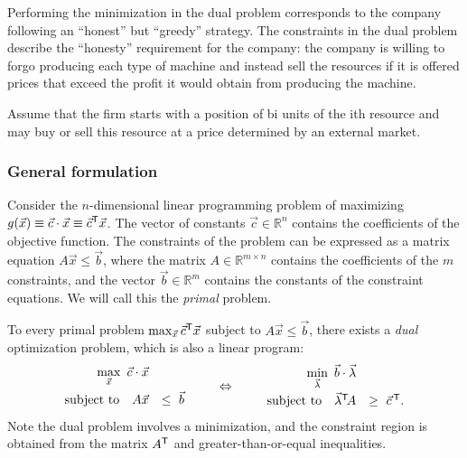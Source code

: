 \documentclass[11pt,oneside]{article}
\begin{document}
			\noindent
			Performing the minimization in the dual problem corresponds to the company following 
			an ``honest'' but ``greedy'' strategy.
			The constraints in the dual problem describe the ``honesty'' requirement for the company:
			the company is willing to forgo producing each type of machine and 
			instead sell the resources if it is offered prices that exceed the profit it would obtain from producing the machine.
			
			
			

			
			

			
			
			
			
			
					
			Assume that the firm starts with a position of bi units of the ith resource and may buy or sell this resource at a price 
			 determined by an external market.
	
				
			
		\subsubsection{General formulation}
		
			Consider the $n$-dimensional linear programming problem of maximizing $g(\vec{x}) \equiv \vec{c} \cdot \vec{x} \equiv  \vec{c}^{\mathsf{T}} \vec{x}$.
			The vector of constants $\vec{c} \in \mathbb{R}^n$ contains the coefficients of the objective function.
			The constraints of the problem can be expressed as a matrix equation $A\vec{x} \leq \vec{b}$,
			where the matrix $A \in \mathbb{R}^{m\times n}$ contains the coefficients of the $m$ constraints,
			and the vector $\vec{b} \in \mathbb{R}^m$ contains the constants of the constraint equations.
			We will call this the \emph{primal} problem.
			
			To every primal problem  $\max_{\vec{x}} \vec{c}^{\mathsf{T}} \vec{x}$ subject to $A\vec{x} \leq \vec{b}$,
			there exists a \emph{dual} optimization problem, which is also a linear program:
			\[
				\begin{array}{rl}
				\displaystyle \max_{\vec{x}} \  \vec{c} \cdot \vec{x} &  \\[3mm]
				\textrm{subject to } \ \ 
						A\vec{x} &\leq \		\vec{b}
				\end{array}
			\qquad
			\Leftrightarrow
			\qquad
				\begin{array}{rl}
				\displaystyle \min_{\vec{\lambda}} \ \vec{b} \cdot \vec{\lambda} &  \\[3mm]
				\textrm{subject to  } \ \ 
						\vec{\lambda}^\sfT \!A &\geq \		\vec{c}^{\,\sfT}.
				\end{array}
			\]
			Note the dual problem involves a minimization,
			and the constraint region is obtained from the matrix $A^{\mathsf{T}}$ and greater-than-or-equal inequalities.
			
\end{document}
